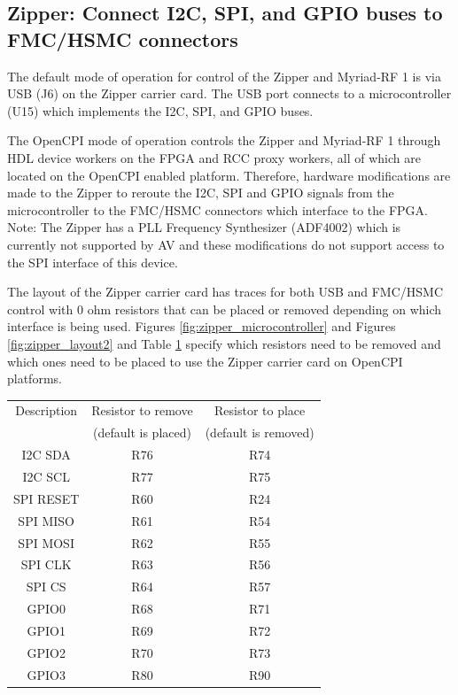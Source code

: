 \documentclass{article}
\begin{document}
\subsection*{Zipper: Connect I2C, SPI, and GPIO buses to FMC/HSMC connectors}
\small
The default mode of operation for control of the Zipper and Myriad-RF 1 is via USB (J6) on the Zipper carrier card. The USB port connects to a microcontroller (U15)  which implements the I2C, SPI, and GPIO buses.\par\medskip
\noindent The OpenCPI mode of operation controls the Zipper and Myriad-RF 1 through HDL device workers on the FPGA and RCC proxy workers, all of which are located on the OpenCPI enabled platform. Therefore, hardware modifications are made to the Zipper to reroute the I2C, SPI and GPIO signals from the microcontroller to the FMC/HSMC connectors which interface to the FPGA. Note: The Zipper has a PLL Frequency Synthesizer (ADF4002) which is currently not supported by AV and these modifications do not support access to the SPI interface of this device.\par\medskip
\noindent The layout of the Zipper carrier card has traces for both USB and FMC/HSMC control with 0 ohm resistors that can be placed or removed depending on which interface is being used. Figures \ref{fig:zipper_microcontroller} and Figures \ref{fig:zipper_layout2} and Table \ref{table:resistors_to_replace} specify which resistors need to be removed and which ones need to be placed to use the Zipper carrier card on OpenCPI platforms.\par\bigskip
	\scriptsize
	\begin{table}[h]
	\begin{center}
	\scriptsize
	\begin{tabular}{|c|c|c|}
		\hline
    	\rowcolor{blue}
    	Description & Resistor to remove & Resistor to place\\
    	\rowcolor{blue}
    	~ & (default is placed) & (default is removed) \\
    	\hline
    	I2C SDA & R76 & R74 \\
    	\hline
    	I2C SCL & R77 & R75 \\
    	\hline
    	SPI RESET & R60 & R24 \\
    	\hline
    	SPI MISO & R61 & R54 \\
    	\hline
    	SPI MOSI & R62 & R55 \\
    	\hline
    	SPI CLK & R63 & R56 \\
    	\hline
    	SPI CS & R64 & R57 \\
    	\hline
    	GPIO0 & R68 & R71 \\
    	\hline
    	GPIO1 & R69 & R72 \\
    	\hline
    	GPIO2 & R70 & R73 \\
    	\hline
    	GPIO3 & R80 & R90 \\
    	\hline
    \end{tabular}
   	\label{table:resistors_to_replace}
	\end{center}
   	\end{table}
\end{document}
